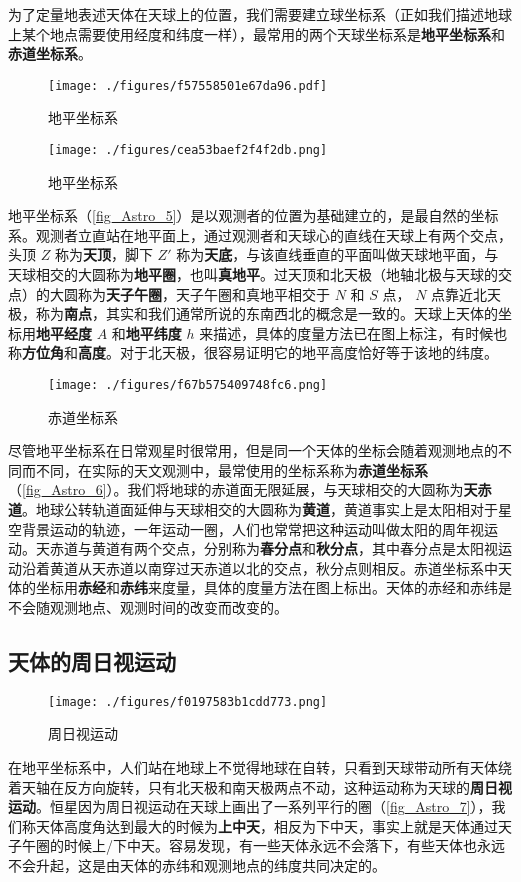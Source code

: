 为了定量地表述天体在天球上的位置，我们需要建立球坐标系（正如我们描述地球上某个地点需要使用经度和纬度一样），最常用的两个天球坐标系是\textbf{地平坐标系}和\textbf{赤道坐标系}。

\begin{figure}[ht]
\centering
\texttt{[image: ./figures/f57558501e67da96.pdf]}
\caption{地平坐标系} \label{fig_Astro_8}
\end{figure}

\begin{figure}[ht]
\centering
\texttt{[image: ./figures/cea53baef2f4f2db.png]}
\caption{地平坐标系} \label{fig_Astro_5}
\end{figure}

地平坐标系（\autoref{fig_Astro_5}）是以观测者的位置为基础建立的，是最自然的坐标系。观测者立直站在地平面上，通过观测者和天球心的直线在天球上有两个交点，头顶 $Z$ 称为\textbf{天顶}，脚下 $Z'$ 称为\textbf{天底}，与该直线垂直的平面叫做天球地平面，与天球相交的大圆称为\textbf{地平圈}，也叫\textbf{真地平}。过天顶和北天极（地轴北极与天球的交点）的大圆称为\textbf{天子午圈}，天子午圈和真地平相交于 $N$ 和 $S$ 点， $N$ 点靠近北天极，称为\textbf{南点}，其实和我们通常所说的东南西北的概念是一致的。天球上天体的坐标用\textbf{地平经度} $A$ 和\textbf{地平纬度} $h$ 来描述，具体的度量方法已在图上标注，有时候也称\textbf{方位角}和\textbf{高度}。对于北天极，很容易证明它的地平高度恰好等于该地的纬度。

\begin{figure}[ht]
\centering
\texttt{[image: ./figures/f67b575409748fc6.png]}
\caption{赤道坐标系} \label{fig_Astro_6}
\end{figure}

尽管地平坐标系在日常观星时很常用，但是同一个天体的坐标会随着观测地点的不同而不同，在实际的天文观测中，最常使用的坐标系称为\textbf{赤道坐标系}（\autoref{fig_Astro_6}）。我们将地球的赤道面无限延展，与天球相交的大圆称为\textbf{天赤道}。地球公转轨道面延伸与天球相交的大圆称为\textbf{黄道}，黄道事实上是太阳相对于星空背景运动的轨迹，一年运动一圈，人们也常常把这种运动叫做太阳的周年视运动。天赤道与黄道有两个交点，分别称为\textbf{春分点}和\textbf{秋分点}，其中春分点是太阳视运动沿着黄道从天赤道以南穿过天赤道以北的交点，秋分点则相反。赤道坐标系中天体的坐标用\textbf{赤经}和\textbf{赤纬}来度量，具体的度量方法在图上标出。天体的赤经和赤纬是不会随观测地点、观测时间的改变而改变的。

\subsection{天体的周日视运动}

\begin{figure}[ht]
\centering
\texttt{[image: ./figures/f0197583b1cdd773.png]}
\caption{周日视运动} \label{fig_Astro_7}
\end{figure}

在地平坐标系中，人们站在地球上不觉得地球在自转，只看到天球带动所有天体绕着天轴在反方向旋转，只有北天极和南天极两点不动，这种运动称为天球的\textbf{周日视运动}。恒星因为周日视运动在天球上画出了一系列平行的圈（\autoref{fig_Astro_7}），我们称天体高度角达到最大的时候为\textbf{上中天}，相反为下中天，事实上就是天体通过天子午圈的时候上/下中天。容易发现，有一些天体永远不会落下，有些天体也永远不会升起，这是由天体的赤纬和观测地点的纬度共同决定的。
